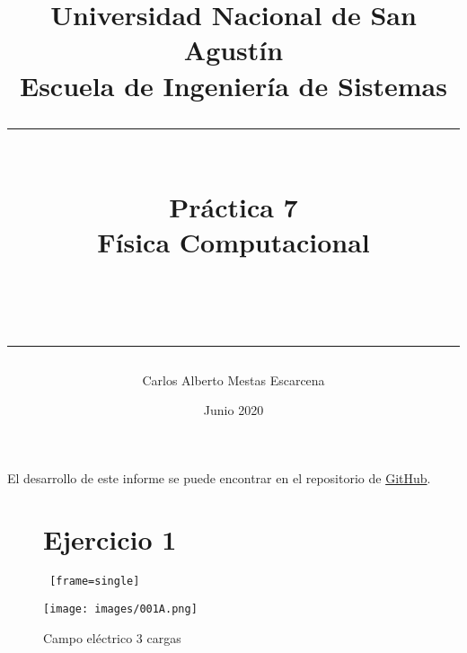 \documentclass{article}
\title{
    Universidad Nacional de San Agustín 
    \\
    \large Escuela de Ingeniería de Sistemas
    \\
    \rule{100mm}{0.1mm}
    \\
    \huge Práctica 7
    \\
    \large Física Computacional

    \\
    \rule{100mm}{0.5mm}
    }
\author{Carlos Alberto Mestas Escarcena}
\date{Junio 2020}
\begin{document}
\maketitle
El desarrollo de este informe se puede encontrar en el repositorio de \textcolor{blue}{
    \href{https://github.com/CarlosMestas/FC_CarlosMestas_Practica7}{GitHub}}.


\clearpage
\newpage

\begin{figure}[H]

\section{Ejercicio 1}

\begin{lstlisting} [frame=single]

\end{lstlisting}

\centering
    \texttt{[image: images/001A.png]}
    \caption{Campo eléctrico 3 cargas}
\end{figure}
\end{document}
